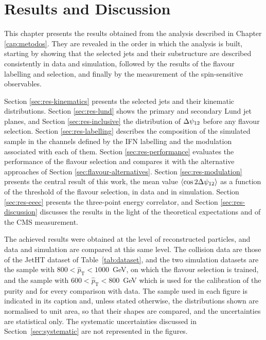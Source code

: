 \chapter{Results and Discussion}
\label{cap:resultados}

This chapter presents the results obtained from the analysis described in
Chapter \ref{cap:metodos}. They are revealed in the order in which the analysis
is built, starting by showing that the
selected jets and their substructure are described consistently in data and
simulation, followed by the results of the flavour labelling and
selection, and finally by the measurement of the spin-sensitive observables.

Section \ref{sec:res-kinematics} presents the selected jets and their kinematic
distributions. Section \ref{sec:res-lund} shows the primary and secondary Lund jet
planes, and Section \ref{sec:res-inclusive} the distribution of $\Delta\psi_{12}$ before any
flavour selection. Section \ref{sec:res-labelling} describes the composition of the
simulated sample in the channels defined by the IFN labelling and the modulation
associated with each of them. Section \ref{sec:res-performance} evaluates the
performance of the flavour selection and compares it with the alternative
approaches of Section \ref{sec:flavour-alternatives}. Section \ref{sec:res-modulation}
presents the central result of this work, the mean value
$\langle \cos 2\Delta\psi_{12} \rangle$ as a function of the threshold of the flavour
selection, in data and in simulation. Section \ref{sec:res-eeec} presents the
three-point energy correlator, and Section \ref{sec:res-discussion} discusses the
results in the light of the theoretical expectations and of the CMS measurement.

The achieved results were obtained at the level of reconstructed particles, and data
and simulation are compared at this same level. The collision data are those of the
JetHT dataset of Table~\ref{tab:dataset}, and the two simulation datasets are the
sample with $800 < \hat{p}_{\mathrm{T}} < 1000$~GeV, on which
the flavour selection is trained, and the sample with $600 < \hat{p}_{\mathrm{T}} < 800$~GeV 
which is used for the calibration of the purity
and for every comparison with data. The sample used in each figure is indicated in its
caption and, unless stated otherwise, the distributions shown are normalised to
unit area, so that their shapes are compared, and the uncertainties are
statistical only. The systematic uncertainties discussed in
Section~\ref{sec:systematic} are not represented in the figures.

